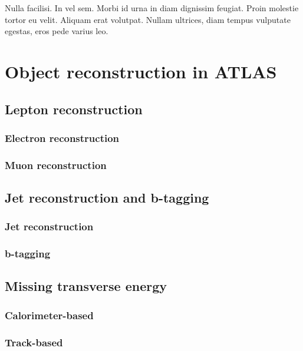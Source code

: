 \begin{savequote}[75mm]
Nulla facilisi. In vel sem. Morbi id urna in diam dignissim feugiat. Proin molestie tortor eu velit. Aliquam erat volutpat. Nullam ultrices, diam tempus vulputate egestas, eros pede varius leo.
\end{savequote}

\chapter{Object reconstruction in ATLAS}

\section{Lepton reconstruction}

\subsection{Electron reconstruction}
\subsection{Muon reconstruction}

\section{Jet reconstruction and b-tagging}

\subsection{Jet reconstruction}

\subsection{b-tagging}

\section{Missing transverse energy}

\subsection{Calorimeter-based}
\subsection{Track-based}